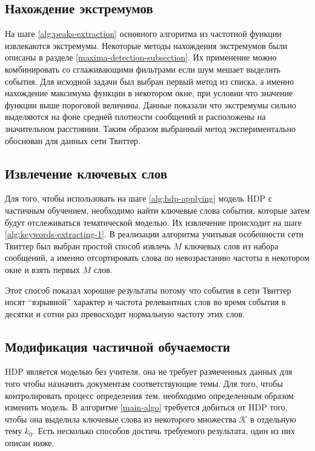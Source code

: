 \documentclass[12pt, a4paper]{article}
\begin{document}
  \subsection{Нахождение экстремумов}
  На шаге \ref{alg:peaks-extraction} основного алгоритма из частотной функции извлекаются экстремумы. Некоторые методы нахождения экстремумов были описаны в разделе \ref{maxima-detection-subsection}. Их применение можно комбинировать со сглаживающими фильтрами если шум мешает выделить события.
  Для исходной задачи был выбран первый метод из списка, а именно нахождение максимума функции в некотором окне, при условии что значение функции выше пороговой величины. Данные показали что экстремумы сильно выделяются на фоне средней плотности сообщений и расположены на значительном расстоянии. Таким образом выбранный метод экспериментально обоснован для данных сети Твиттер.  
  
  \subsection{Извлечение ключевых слов}
  Для того, чтобы использовать на шаге \ref{alg:hdp-applying} модель HDP с частичным обучением, необходимо найти ключевые слова события, которые затем будут отслеживаться тематической моделью. Их извлечение происходит на шаге \ref{alg:keywords-extracting-1}. В реализации алгоритма учитывая особенности сети Твиттер был выбран простой способ извлечь $M$ ключевых слов из набора сообщений, а именно отсортировать слова по невозрастанию частоты в некотором окне и взять первых $M$ слов.
  
  Этот способ показал хорошие результаты потому что события в сети Твиттер носят ``взрывной'' характер и частота релевантных слов во время события в десятки и сотни раз превосходит нормальную частоту этих слов.
  
  \subsection{Модификация частичной обучаемости}
  HDP является моделью без учителя, она не требует размеченных данных для того чтобы назначить документам соответствующие темы. Для того, чтобы контролировать процесс определения тем, необходимо определенным образом изменить модель. В алгоритме \ref{main-algo} требуется добиться от HDP того, чтобы она выделила ключевые слова из некоторого множества $\mathcal{K}$ в отдельную тему $k_0$. Есть несколько способов достичь требуемого результата, один из них описан ниже.
  
\end{document}
